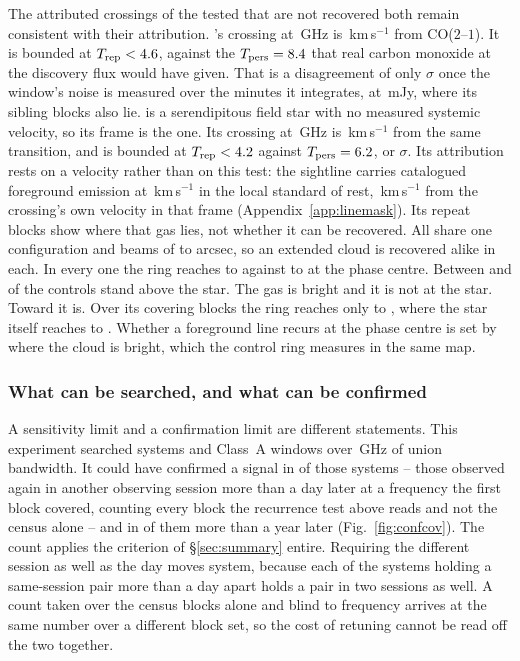 The \MkAttrExcl{} attributed crossings of the \MkAttrTested{} tested that are
not recovered both remain consistent with their attribution. \RqHrStar's crossing at \RqHrFreq\,GHz is \RqHrDv\,km\,s$^{-1}$ from
CO($2$--$1$). It is bounded at $T_{\rm rep}<4.6$, against the
$T_{\rm pers}=8.4$ that real carbon monoxide at the discovery flux
would have given. That is a disagreement of only \RqHrExcl$\sigma$ once the
window's noise is measured over the \RqHrOnsMin{} minutes it integrates, at
\RqHrRms\,mJy, where its sibling blocks also lie. \RqAjStar{} is a serendipitous field star with no measured systemic
velocity, so its frame is the \RqAjFrame{} one. Its crossing at
\RqAjFreq\,GHz is \RqAjDv\,km\,s$^{-1}$ from the same transition, and is
bounded at $T_{\rm rep}<4.2$ against $T_{\rm pers}=6.2$, or
\RqAjExcl$\sigma$. Its attribution rests
on a velocity rather than on this test: the sightline carries catalogued
foreground emission at \LsLupVco\,km\,s$^{-1}$ in the local standard of rest,
\LsLupDv\,km\,s$^{-1}$ from the crossing's own velocity in that frame
(Appendix~\ref{app:linemask}). Its repeat blocks show where that gas lies, not
whether it can be recovered. All \RqAjNRep{} share one \RqAjArray{} configuration and beams of
\RqAjBeamLo{} to \RqAjBeamHi{} arcsec, so an extended cloud is recovered
alike in each. In every one the ring reaches \RqAjCtrlLo{} to \RqAjCtrlHi{} against
\RqAjStarLo{} to \RqAjStarHi{} at the phase centre. Between \RqAjNgeLo{} and
\RqAjNgeHi{} of the \NCtrl{} controls stand above the star.
The gas is bright and it is not at the star. Toward \RqRecurCloudStars{} it is. Over its \RqCtlNBlock{} covering blocks
the ring reaches only \RqCtlRingLo{} to \RqCtlRingHi, where the star itself
reaches \RqCtlStarLo{} to \RqCtlStarHi.
Whether a foreground line recurs at the phase centre is set by where the cloud
is bright, which the control ring measures in the same map.

\subsubsection{What can be searched, and what can be confirmed}
\label{sec:confirmability}

A sensitivity limit and a confirmation limit are different statements. This experiment searched \RcSearchSys{} systems and \RcSearchWin{}
Class~A windows over \CvUnionA\,GHz of union bandwidth. It could have
confirmed a signal in \ZcConfSysDay{} of those systems -- those observed
again in another observing session more than a day later at a frequency the
first block covered, counting every block the recurrence test above reads and
not the census alone -- and
in \ZcConfSysYr{} of them more than a year later
(Fig.~\ref{fig:confcov}). The count applies the criterion of
\S\ref{sec:summary} entire. Requiring the different session as well as the day
moves \QfNSysMovedWord{} system, because each of the \QfNSysPairDropWord{}
systems holding a same-session pair more than a day apart holds a pair in two
sessions as well. A count taken over the census blocks alone and blind to
frequency arrives at the same number over a different block set, so the cost
of retuning cannot be read off the two together.


